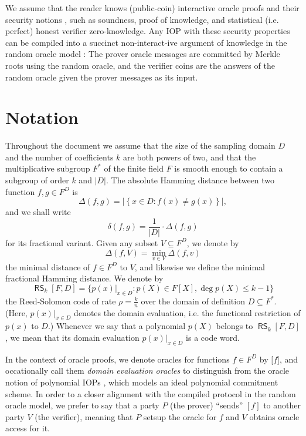 \documentclass[11pt,article,oneside]{memoir}
\theoremstyle{definition}
\theoremstyle{remark}
\DeclareMathOperator{\RS}{\mathsf{RS}}
\begin{document}
We assume that the reader knows (public-coin) interactive oracle proofs and their security notions  \cite{IOPs}, such as soundness, proof of knowledge, and statistical (i.e. perfect) honest verifier zero-knowledge. 
Any IOP with these security properties can be compiled into a succinct non-interact-ive argument of knowledge in the random oracle model \cite{IOPs}:
The prover oracle messages are committed by Merkle roots using the random oracle, and the verifier coins are the answers of the random oracle given the prover messages as its input.


\section{Notation}
Throughout the document we assume that the size of the sampling domain $D$ and the number of coefficients $k$ are both powers of two, and that the multiplicative subgroup $F^*$ of the finite field $F$ is smooth enough to contain a subgroup of order $k$ and $|D|$. 
The absolute Hamming distance between two function $f,g\in F^D$ is
\begin{equation*}
\Delta(f, g) = \big|\left\{x\in D: f(x)\neq g(x)\right\}\big|,
\end{equation*}
and we shall write 
\[
\delta(f, g) = \frac{1}{|D|}\cdot \Delta(f,g)
\] 
for its fractional variant.
Given any subset $V\subseteq F^D$, we denote by
\[
\Delta(f, V) = \min_{v\in V} \Delta(f,v)
\]
the minimal distance of $f\in F^D$ to $V$, and likewise we define the minimal fractional Hamming distance.
We denote by
\begin{equation*}
\RS_k[F,D] = \big\{ \left.p(x)\right|_{x\in D} : p(X)\in F[X], \deg p(X) \leq k-1 \big\}
\end{equation*}
the Reed-Solomon code of rate $\rho = \frac{k}{n}$ over the domain of definition $D\subseteq F^*$. 
(Here, $p(x)|_{x\in D}$ denotes the domain evaluation, i.e.  the functional restriction of $p(x)$ to $D$.)
Whenever we say that a polynomial $p(X)$ belongs to $\RS_k[F,D]$, we mean that its domain evaluation $p(x)|_{x\in D}$ is a code word. 

In the context of oracle proofs, we denote oracles for  functions $f\in F^D$ by
$\big[ f \big]$, and occationally call them \textit{domain evaluation oracles} to distinguish from the oracle notion of polynomial IOPs \cite{DARK}, which models an ideal polynomial commitment scheme.
In order to a closer alignment with the compiled protocol in the random oracle model, we prefer to say that a party $P$ (the prover) ``sends'' $[f]$ to another party $V$ (the verifier), meaning that $P$ setsup the oracle for $f$ and $V$ obtains oracle access for it.
\end{document}
